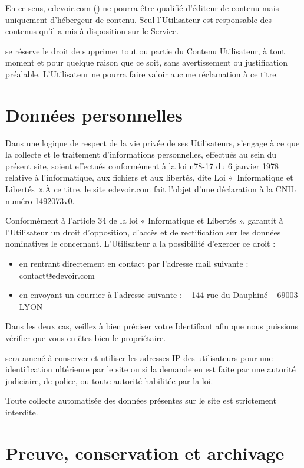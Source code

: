 En ce sens, edevoir.com (\eDevoir) ne pourra être qualifié d'éditeur de contenu mais uniquement d'hébergeur de contenu. Seul l'Utilisateur est responsable des contenus qu'il a mis à disposition sur le Service.

\eDevoir se réserve le droit de supprimer tout ou partie du Contenu Utilisateur, à tout moment et pour quelque raison que ce soit, sans avertissement ou justification préalable. L'Utilisateur ne pourra faire valoir aucune réclamation à ce titre. 


\section{Données personnelles}

Dans une logique de respect de la vie privée de ses Utilisateurs, \eDevoir s'engage à ce que la collecte et le traitement d'informations personnelles, effectués au sein du présent site, soient effectués conformément à la loi n78-17 du 6 janvier 1978 relative à l'informatique, aux fichiers et aux libertés, dite Loi «~Informatique et Libertés~».À ce titre, le site edevoir.com fait l'objet d'une déclaration à la CNIL numéro 1492073v0.

Conformément à l'article 34 de la loi « Informatique et Libertés », \eDevoir garantit à l'Utilisateur un droit d'opposition, d'accès et de rectification sur les données nominatives le concernant. L'Utilisateur a la possibilité d'exercer ce droit :
\begin{itemize}
   \item en rentrant directement en contact par l'adresse mail suivante : contact@edevoir.com
   \item en envoyant un courrier à l'adresse suivante : \eDevoir -- 144 rue du Dauphiné -- 69003 LYON
\end{itemize}
 Dans les deux cas, veillez à bien préciser votre Identifiant afin que nous puissions vérifier que vous en êtes bien le propriétaire.

\eDevoir sera amené à conserver et utiliser les adresses IP des utilisateurs pour une identification ultérieure par le site ou si la demande en est faite par  une autorité judiciaire, de police, ou toute autorité habilitée par la loi.

Toute collecte automatisée des données présentes sur le site est strictement interdite.


\section{Preuve, conservation et archivage}

